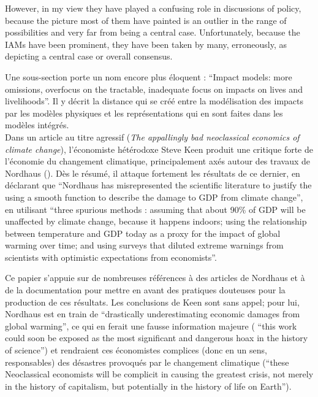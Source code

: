 \begin{authoredquote}
    However, in my view they have played a confusing role in discussions of policy, because the picture most of them have painted is an outlier in the range of possibilities and very far from being a central case. Unfortunately, because the IAMs have been prominent, they have been taken by many, erroneously, as depicting a central case or overall consensus.
\end{authoredquote}

Une sous-section porte un nom encore plus éloquent : \enquote{Impact models: more omissions, overfocus on the tractable, inadequate focus on impacts on lives and livelihoods}. Il y décrit la distance qui se créé entre la modélisation des impacts par les modèles physiques et les représentations qui en sont faites dans les modèles intégrés. \\

Dans un article au titre agressif (\emph{The appallingly bad neoclassical economics of climate change}), l'économiste hétérodoxe Steve Keen produit une critique forte de l'économie du changement climatique, principalement axés autour des travaux de Nordhaus (\textcite{keen_appallingly_2021}). Dès le résumé, il attaque fortement les résultats de ce dernier, en déclarant que \enquote{Nordhaus has misrepresented the scientific literature to justify the using a smooth function to describe the damage to GDP from climate change}, en utilisant \enquote{three spurious methods : assuming that about 90\% of GDP will be unaffected by climate change, because it happens indoors; using the relationship between temperature and GDP today as a proxy for the impact of global warming over time; and using surveys that diluted extreme warnings from scientists with optimistic expectations from economists}. 

Ce papier s'appuie sur de nombreuses références à des articles de Nordhaus et à de la documentation pour mettre en avant des pratiques douteuses pour la production de ces résultats. Les conclusions de Keen sont sans appel; pour lui, Nordhaus est en train de \enquote{drastically underestimating economic damages from global warming}, ce qui en ferait une fausse information majeure ( \enquote{this work could soon be exposed as the most significant and dangerous hoax in the history of science})  et rendraient ces économistes complices (donc en un sens, responsables) des désastres provoqués par le changement climatique (\enquote{these Neoclassical economists will be complicit in causing the greatest crisis, not merely in the history of capitalism, but potentially in the history of life on Earth}).

